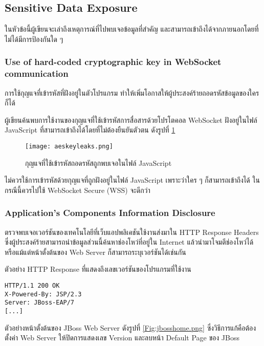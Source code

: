 \subsection{Sensitive Data Exposure}

ในหัวข้อนี้ผู้เขียนจะเล่าถึงเหตุการณ์ที่ไปพบเจอข้อมูลที่สำคัญ และสามารถเข้าถึงได้จากภายนอกโดยที่ไม่ได้มีการป้องกันใด ๆ
 
 
\subsubsection{Use of hard-coded cryptographic key in WebSocket communication}

การใช้กุญแจที่เข้ารหัสที่ฝังอยู่ในตัวโปรแกรม ทำให้เพิ่มโอกาสให้ผู้ประสงค์ร้ายถอดรหัสข้อมูลของใครก็ได้

ผู้เขียนค้นพบการใช้งานของกุญแจที่ใช้เข้ารหัสการสื่อสารด้วยโปรโตคอล WebSocket ฝังอยู่ในไฟล์ JavaScript ที่สามารถเข้าถึงได้โดยที่ไม่ต้องยืนยันตัวตน ดังรูปที่ \ref{Fig:aeskeyleaks.png}

 \begin{figure}[h]
	\centering
	\texttt{[image: aeskeyleaks.png]}
	\caption{กุญแจที่ใช้เข้ารหัสถอดรหัสถูกพบเจอในไฟล์ JavaScript}
	\label{Fig:aeskeyleaks.png}
\end{figure}
 
 ไม่ควรใช้การเข้ารหัสด้วยกุญแจที่ถูกฝังอยู่ในไฟล์ JavaScript เพราะว่าใคร ๆ ก็สามารถเข้าถึงได้ ในกรณีนี้ควรไปใช้ WebSocket Secure (WSS) จะดีกว่า
 
 \subsubsection{Application's Components Information Disclosure}
 
 ตรวจพบเจอเวอร์ชันของเทคโนโลยีที่เว็บแอปพลิเคชันใช้งานส่งมาใน HTTP Response Headers ซึ่งผู้ประสงค์ร้ายสามารถนำข้อมูลส่วนนี้ค้นหาช่องโหว่ที่อยู่ใน Internet แล้วนำมาโจมตีช่องโหว่ได้ หรือแม้แต่หน้าตั้งต้นของ Web Server ก็สามารถระบุเวอร์ชันได้เช่นกัน
 
 ตัวอย่าง HTTP Response ที่แสดงถึงเลขเวอร์ชันของโปรแกรมที่ใช้งาน
 
\begin{lstlisting}[numbers=none] 
HTTP/1.1 200 OK
X-Powered-By: JSP/2.3
Server: JBoss-EAP/7
[...]
\end{lstlisting}
 
ตัวอย่างหน้าตั้งต้นของ JBoss Web Server ดังรูปที่ \ref{Fig:jbosshome.png} ซึ่งวิธีการแก้คือต้องตั้งค่า Web Server ให้ปิดการแสดงเลข Version และลบหน้า Default Page ของ JBoss

